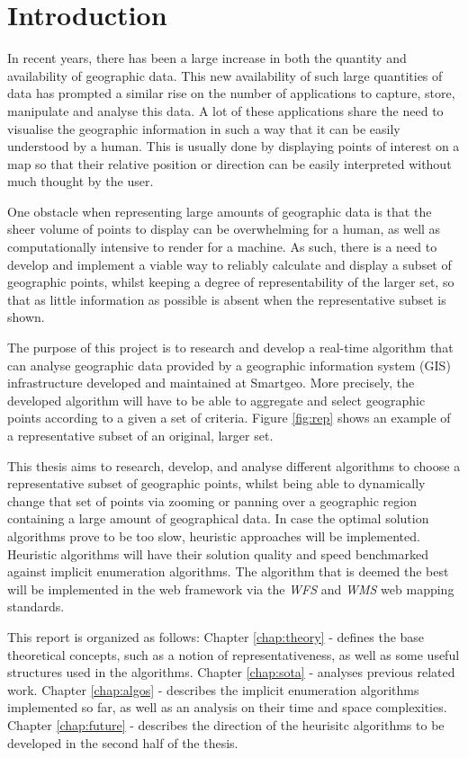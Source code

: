 \chapter{Introduction}
\label{chap:intro}

In recent years, there has been a large increase in both the quantity and availability of geographic data. This new availability of such large quantities of data has prompted a similar rise on the number of applications to capture, store, manipulate and analyse this data.
A lot of these applications share the need to visualise the geographic information in such a way that it can be easily understood by a human.
This is usually done by displaying points of interest on a map so that their relative position or direction can be easily interpreted without much thought by the user.

One obstacle when representing large amounts of geographic data is that the sheer volume of points to display can be overwhelming for a human, as well as computationally intensive to render for a machine. As such, there is a need to develop and implement a viable way to reliably calculate and display a subset of geographic points, whilst keeping a degree of representability of the larger set, so that as little information as possible is absent when the representative subset is shown.

The purpose of this project is to research and develop a real-time algorithm that can analyse geographic data provided by a geographic information system (GIS) infrastructure developed and maintained at Smartgeo. More precisely, the developed algorithm will have to be able to aggregate and select geographic points according to a given a set of criteria. Figure \ref{fig:rep} shows an example of a representative subset of an original, larger set.


This thesis aims to research, develop, and analyse different algorithms to choose a representative subset of geographic points, whilst being able to dynamically change that set of points via zooming or panning over a geographic region containing a large amount of geographical data. In case the optimal solution algorithms prove to be too slow, heuristic approaches will be implemented. Heuristic algorithms will have their solution quality and speed benchmarked against implicit enumeration algorithms.
The algorithm that is deemed the best will be implemented in the web framework via the \emph{WFS} and \emph{WMS} web mapping standards.

This report is organized as follows:
Chapter \ref{chap:theory} -  defines the base theoretical concepts, such as a notion of representativeness, as well as some useful structures used in the algorithms. Chapter \ref{chap:sota} -  analyses previous related work. Chapter \ref{chap:algos} -  describes the implicit enumeration algorithms implemented so far, as well as an analysis on their time and space complexities. Chapter \ref{chap:future} -  describes the direction of the heurisitc algorithms to be developed in the second half of the thesis. 